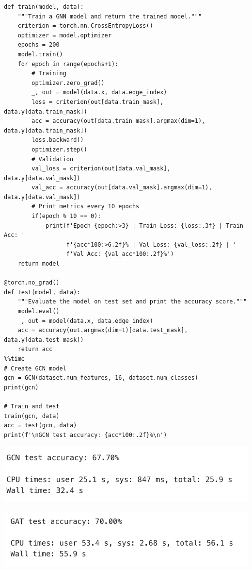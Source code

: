 \documentclass{article}
\begin{document}
\begin{lstlisting}[style=mystyle]
def train(model, data):
    """Train a GNN model and return the trained model."""
    criterion = torch.nn.CrossEntropyLoss()
    optimizer = model.optimizer
    epochs = 200
    model.train()
    for epoch in range(epochs+1):
        # Training
        optimizer.zero_grad()
        _, out = model(data.x, data.edge_index)
        loss = criterion(out[data.train_mask], data.y[data.train_mask])
        acc = accuracy(out[data.train_mask].argmax(dim=1), data.y[data.train_mask])
        loss.backward()
        optimizer.step()
        # Validation
        val_loss = criterion(out[data.val_mask], data.y[data.val_mask])
        val_acc = accuracy(out[data.val_mask].argmax(dim=1), data.y[data.val_mask])
        # Print metrics every 10 epochs
        if(epoch % 10 == 0):
            print(f'Epoch {epoch:>3} | Train Loss: {loss:.3f} | Train Acc: '
                  f'{acc*100:>6.2f}% | Val Loss: {val_loss:.2f} | '
                  f'Val Acc: {val_acc*100:.2f}%')      
    return model

@torch.no_grad()
def test(model, data):
    """Evaluate the model on test set and print the accuracy score."""
    model.eval()
    _, out = model(data.x, data.edge_index)
    acc = accuracy(out.argmax(dim=1)[data.test_mask], data.y[data.test_mask])
    return acc
%%time
# Create GCN model
gcn = GCN(dataset.num_features, 16, dataset.num_classes)
print(gcn)

# Train and test
train(gcn, data)
acc = test(gcn, data)
print(f'\nGCN test accuracy: {acc*100:.2f}%\n')
\end{lstlisting}

\vspace{0.5cm}

\begin{center}
    \includegraphics[width=0.5\linewidth]{img/precisionnoentrenado.png}
\end{center}

\vspace{0.5cm}

\begin{center}
    \includegraphics[width=0.5\linewidth]{img/precisionentrenado.png}
\end{center}
\end{document}
